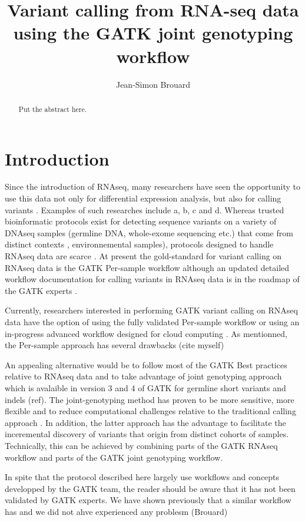 \documentclass[]{article}
\title{Variant calling from RNA-seq data using the GATK joint genotyping workflow}
\author{Jean-Simon Brouard}
\begin{document}
\maketitle

\begin{abstract}
Put the abstract here.
\end{abstract}

\section{Introduction}
Since the introduction of RNAseq, many researchers have seen the opportunity to use this data not only for differential expression analysis, but also for calling variants \cite{Piskol2013}. Examples of such researches include a, b, c and d. Whereas trusted bioinformatic protocols exist for detecting sequence variants on a variety of DNAseq samples (germline DNA, whole-exome sequencing etc.) that come from distinct contexts \cite{Koboldt2020}, environnemental samples), protocols designed to handle RNAseq data are scarce \cite{Piskol2013}. At present the gold-standard for variant calling on RNAseq data is the GATK Per-sample workflow although an updated detailed workflow documentation for calling variants in RNAseq data is in the roadmap of the GATK experts \cite{GATK_best_RNAseq}.


Currently, researchers interested in performing GATK variant calling on RNAseq data have the option of using the fully validated Per-sample workflow \cite{GATK_RNAseq_variant_discovery} or using an in-progress advanced workflow designed for cloud computing \cite{GATK_gatk4_rnaseq_github}.
As mentionned, the Per-sample approach has several drawbacks (cite myself)

An appealing alternative would be to follow most of the GATK Best practices relative to RNAseq data and to take advantage of joint genotyping approach which is avalaible in version 3 and 4 of GATK for germline short variants and indels (ref). The joint-genotyping method has proven to be more sensitive, more flexible and to reduce computational challenges relative to the traditional calling approach \cite{GATK_jointCalling_1}. In addition, the latter approach has the advantage to facilitate the inceremental discovery of variants that origin from distinct cohorts of samples. Technically, this can be achieved by combining parts of the GATK RNAseq workflow and parts of the GATK joint genotyping workflow.

In spite that the protocol described here largely use workflows and concepts developped by the GATK team, the reader should be aware that it has not been validated by GATK experts. We have shown previously that a similar workflow has and we did not ahve experienced any problesm (Brouard)
\end{document}
